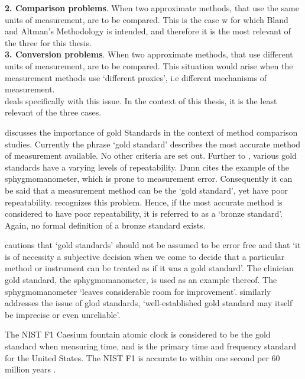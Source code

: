 \documentclass[12pt, a4paper]{report}
\theoremstyle{plain}
\theoremstyle{definition}
\theoremstyle{remark}
\begin{document}
	\smallskip \textbf{2. Comparison problems}. When two approximate
	methods, that use the same units of measurement, are to be
	compared. This is the case w
	for which Bland and Altman's Methodology is intended, and therefore it is the most relevant of
	the three for this thesis.\\
	
	\smallskip \textbf{3. Conversion problems}. When two approximate
	methods, that use different units of measurement, are to be
	compared. This situation would arise when the measurement methods
	use `different proxies', i.e different mechanisms of measurement.\\
	\smallskip
	\citet{lewis1991} deals specifically with this issue. In the context
	of this thesis, it is the least relevant of the three cases.
	
		
		
			\citet{Aroy2015} discusses the importance of gold Standards in the context of method comparison studies.
			Currently the phrase `gold standard' describes the most accurate method of measurement available. No other criteria are set out. Further to \citet{DunnSEME}, various gold standards have a varying levels of repeatability. Dunn cites the example of the sphygmomanometer, which is prone to measurement error. Consequently it can be said that a measurement method can be the `gold standard', yet have poor repeatability. \citet{DunnSEME} recognizes this problem. Hence, if the most accurate method is considered to have poor repeatability, it is referred to as a `bronze standard'.  Again, no formal definition of a bronze standard exists.
		
	
		
	\citet[p.47]{DunnSEME} cautions that `gold standards' should not be
	assumed to be error free and that `it is of necessity a subjective
	decision when we come to decide that a particular method or
	instrument can be treated as if it was a gold standard'. The
	clinician gold standard, the sphygmomanometer, is used as an
	example thereof.  The sphygmomanometer `leaves considerable room
	for improvement'. \citet{pizzi} similarly
	addresses the issue of glod standards, `well-established gold
	standard may itself be imprecise or even unreliable'.
	
	
	The NIST F1 Caesium fountain atomic clock is considered to be the
	gold standard when measuring time, and is the primary time and
	frequency standard for the United States. The NIST F1 is accurate
	to within one second per 60 million years \citep{NIST}.
	
\end{document}
